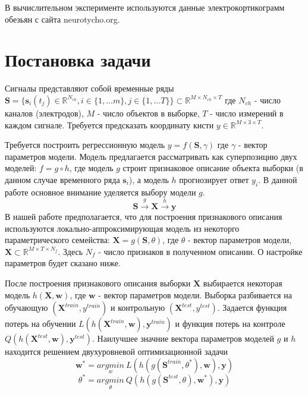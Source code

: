 \documentclass[12pt,twoside]{article}
\begin{document}
В вычислительном эксперименте используются данные электрокортикограмм обезьян с сайта neurotycho.org.

\section{Постановка задачи}
 Сигналы представляют собой временные ряды $\mathbf{S} = \bigl\{ \mathbf{s}_i(t_j) \in \mathbb{R}^{N_{ch}},i \in \{1,\dots m\}, j \in  \{1,\dots T\}\bigr\} \subset \mathbb{R}^{M \times N_{ch} \times T}$ где $N_{ch}$ - число каналов (электродов), $M$ - число объектов в выборке, $T$ - число измерений в каждом сигнале. Требуется предсказать координату кисти $y \in \mathbb{R}^{M \times 3 \times T}$.

Требуется построить регрессионную модель $y = f(\mathbf{S},\gamma)$ где $\gamma$ - вектор параметров модели. Модель предлагается рассматривать как суперпозицию двух моделей: $f = g \circ h$, где модель $g$ строит признаковое описание объекта выборки (в данном случае временного ряда $\mathbf{s}_i$), а модель $h$ прогнозирует ответ $y_i$. В данной работе основное внимание уделяется выбору модели $g$.
\[
\mathbf{S} \xrightarrow{g} \mathbf{X} \xrightarrow{h} \mathbf{y}
\]
В нашей работе предполагается, что для построения признакового описания используются локально-аппроксимирующая модель из некоторго параметрического семейства: $\mathbf{X} = g(\mathbf{S}, \theta)$, где $\theta$ - вектор параметров модели, $\mathbf{X} \subset \mathbb{R}^{M\times T \times N_{f}}$. Здесь $N_{f}$ - число признаков в полученном описании. О настройке параметров будет сказано ниже. 

После построения признакового описания выборки $\mathbf{X}$ выбирается некоторая модель $h(\mathbf{X},\mathbf{w})$, где $\mathbf{w}$ - вектор параметров модели. Выборка разбивается на обучающую $(\mathbf{X}^{train},y^{train})$ и контрольную $(\mathbf{X}^{test},y^{test})$. Задается функция потерь на обучении $L(h(\mathbf{X}^{train},\mathbf{w}),\mathbf{y}^{train})$ и функция потерь на контроле
$Q(h(\mathbf{X}^{test},\mathbf{w}),\mathbf{y}^{test})$. Наилучшее значние вектора параметров моделей $g$ и $h$ находится решением двухуровневой оптимизационной задачи 
\begin{equation}
    \mathbf{w^{*}} = \underset{w}{argmin}\medspace L(h(g(\mathbf{S}^{train},\theta^*),\mathbf{w}),\mathbf{y})
\end{equation}
\begin{equation}
     \theta^* = \underset{\theta}{argmin}\medspace Q(h(g(\mathbf{S}^{test},\theta),\mathbf{w^{*}}),\mathbf{y})
\end{equation}







\end{document}
